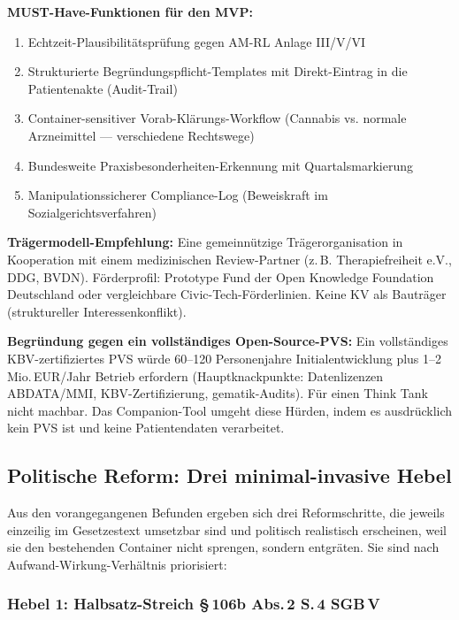 \documentclass{umbruch-position}
\begin{document}
\textbf{MUST-Have-Funktionen für den MVP:}

\begin{enumerate}[nosep]
  \item Echtzeit-Plausibilitätsprüfung gegen AM-RL Anlage III/V/VI
  \item Strukturierte Begründungspflicht-Templates mit Direkt-Eintrag in die Patientenakte (Audit-Trail)
  \item Container-sensitiver Vorab-Klärungs-Workflow (Cannabis vs. normale Arzneimittel — verschiedene Rechtswege)
  \item Bundesweite Praxisbesonderheiten-Erkennung mit Quartalsmarkierung
  \item Manipulationssicherer Compliance-Log (Beweiskraft im Sozialgerichtsverfahren)
\end{enumerate}

\textbf{Trägermodell-Empfehlung:} Eine gemeinnützige Trägerorganisation in Kooperation mit einem medizinischen Review-Partner (z.\,B. Therapiefreiheit e.V., DDG, BVDN). Förderprofil: Prototype Fund der Open Knowledge Foundation Deutschland oder vergleichbare Civic-Tech-Förderlinien. Keine KV als Bauträger (struktureller Interessenkonflikt).

\textbf{Begründung gegen ein vollständiges Open-Source-PVS:} Ein vollständiges KBV-zertifiziertes PVS würde 60--120 Personenjahre Initialentwicklung plus 1--2\,Mio.\,EUR/Jahr Betrieb erfordern (Hauptknackpunkte: Datenlizenzen ABDATA/MMI, KBV-Zertifizierung, gematik-Audits). Für einen Think Tank nicht machbar. Das Companion-Tool umgeht diese Hürden, indem es ausdrücklich kein PVS ist und keine Patientendaten verarbeitet.

\subsection{Politische Reform: Drei minimal-invasive Hebel}

Aus den vorangegangenen Befunden ergeben sich drei Reformschritte, die jeweils einzeilig im Gesetzestext umsetzbar sind und politisch realistisch erscheinen, weil sie den bestehenden Container nicht sprengen, sondern entgräten. Sie sind nach Aufwand-Wirkung-Verhältnis priorisiert:

\subsubsection*{Hebel 1: Halbsatz-Streich \S\,106b Abs.\,2 S.\,4 SGB\,V}
\end{document}
